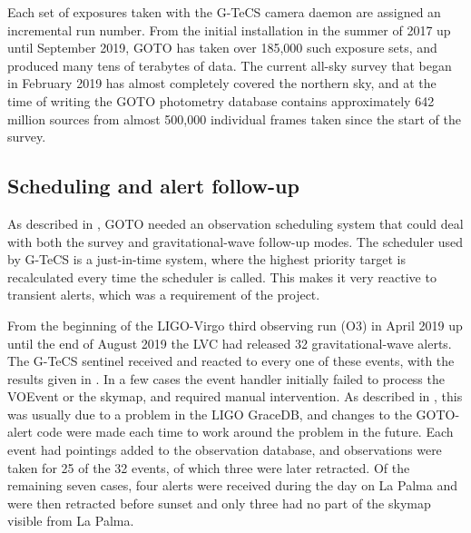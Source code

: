\begin{colsection}
\begin{colsection}
Each set of exposures taken with the G-TeCS camera daemon are assigned an incremental run number. From the initial installation in the summer of 2017 up until September 2019, GOTO has taken over 185,000 such exposure sets, and produced many tens of terabytes of data. The current all-sky survey that began in February 2019 has almost completely covered the northern sky, and at the time of writing the GOTO photometry database contains approximately 642 million sources from almost 500,000 individual frames taken since the start of the survey.

\end{colsection}

\newpage
\subsection{Scheduling and alert follow-up}
\label{sec:gw_results}
\begin{colsection}

As described in , GOTO needed an observation scheduling system that could deal with both the survey and gravitational-wave follow-up modes. The scheduler used by G-TeCS is a just-in-time system, where the highest priority target is recalculated every time the scheduler is called. This makes it very reactive to transient alerts, which was a requirement of the project.

From the beginning of the LIGO-Virgo third observing run (O3) in April 2019 up until the end of August 2019 the LVC had released 32 gravitational-wave alerts. The G-TeCS sentinel received and reacted to every one of these events, with the results given in . In a few cases the event handler initially failed to process the VOEvent or the skymap, and required manual intervention. As described in
,
this was usually due to a problem in the LIGO GraceDB, and changes to the GOTO-alert code were made each time to work around the problem in the future. Each event had pointings added to the observation database, and observations were taken for 25 of the 32 events, of which three were later retracted. Of the remaining seven cases, four alerts were received during the day on La Palma and were then retracted before sunset and only three had no part of the skymap visible from La Palma.


\end{colsection}
\end{colsection}
